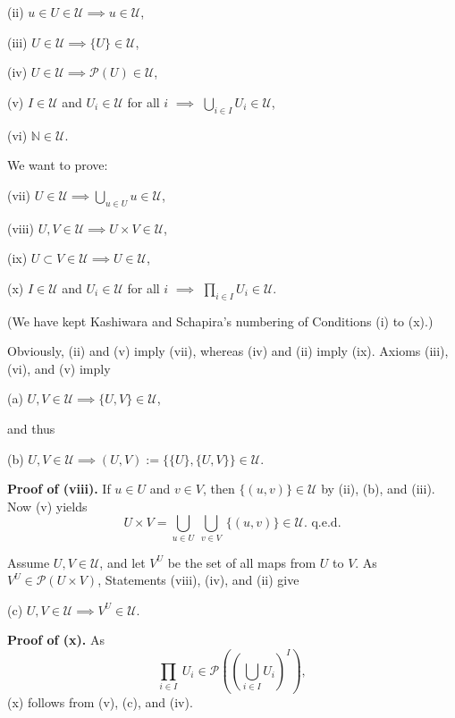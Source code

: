 \documentclass[12pt]{article}
\theoremstyle{remark}%
\newcommand{\n}{\noindent}
\begin{document}
(ii) $u\in U\in\mathcal U\implies u\in \mathcal U$,

(iii) $U\in\mathcal U\implies\{U\}\in\mathcal U$,

(iv) $U\in\mathcal U\implies\mathcal P(U)\in\mathcal U$,

(v) $I\in\mathcal U$ and $U_i\in\mathcal U$ for all $i$ $\implies$ $\bigcup_{i\in I}U_i\in\mathcal U$,

(vi) $\mathbb N\in\mathcal U$.

\n We want to prove:

(vii) $U\in\mathcal U\implies\bigcup_{u\in U}u\in\mathcal U$,

(viii) $U,V\in\mathcal U\implies U\times V\in\mathcal U$,

(ix) $U\subset V\in\mathcal U\implies U\in\mathcal U$,

(x) $I\in \mathcal U$ and $U_i\in\mathcal U$ for all $i$ $\implies$ $\prod_{i\in I}U_i\in\mathcal U$.

\n(We have kept Kashiwara and Schapira's numbering of Conditions (i) to (x).) 

\n Obviously, (ii) and (v) imply (vii), whereas (iv) and (ii) imply (ix). Axioms (iii), (vi), and (v) imply

(a) $U,V\in\mathcal U\implies\{U,V\}\in\mathcal U$,

\n and thus

(b) $U,V\in\mathcal U\implies(U,V):=\{\{U\},\{U,V\}\}\in\mathcal U$.

\n\textbf{Proof of (viii).} If $u\in U$ and $v\in V$, then $\{(u,v)\}\in\mathcal U$ by (ii), (b), and (iii). Now (v) yields 
$$
U\times V=\bigcup_{u\in U}\ \bigcup_{v\in V}\ \{(u,v)\}\in\mathcal U.\text{ q.e.d.} 
$$ 

Assume $U,V\in\mathcal U$, and let $V^U$ be the set of all maps from $U$ to $V$. As $V^U\in\mathcal P(U\times V)$, Statements (viii), (iv), and (ii) give

(c) $U,V\in\mathcal U\implies V^U\in\mathcal U$. 

\n\textbf{Proof of (x).} As 
$$
\prod_{i\in I}\ U_i\in\mathcal P\left(\left(\bigcup_{i\in I}U_i\right)^I\right),
$$
(x) follows from (v), (c), and (iv). 
%
\end{document}
